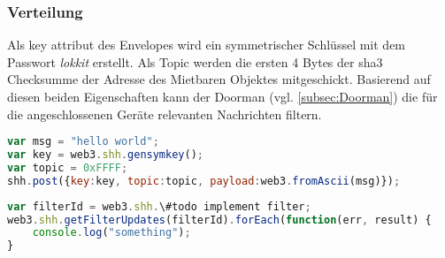 \subsubsection{Verteilung}
\label{sys_subsubsec:Verteilung}
Als key attribut des Envelopes wird ein symmetrischer Schlüssel mit dem Passwort \emph{lokkit} erstellt. Als Topic werden die ersten 4 Bytes der sha3 Checksumme der Adresse des Mietbaren Objektes mitgeschickt. Basierend auf diesen beiden Eigenschaften kann der Doorman (vgl. \ref{subsec:Doorman}) die für die angeschlossenen Geräte relevanten Nachrichten filtern.

\begin{lstlisting}[language=javascript,caption={Beispiel einer Whisper v5 Nachricht}]
var msg = "hello world";
var key = web3.shh.gensymkey();
var topic = 0xFFFF;
shh.post({key:key, topic:topic, payload:web3.fromAscii(msg)});
\end{lstlisting}


\begin{lstlisting}[language=javascript,caption={Beispiel eines Whisper v5 Filters}]
var filterId = web3.shh.\#todo implement filter;
web3.shh.getFilterUpdates(filterId).forEach(function(err, result) {
    console.log("something");
}
\end{lstlisting}
